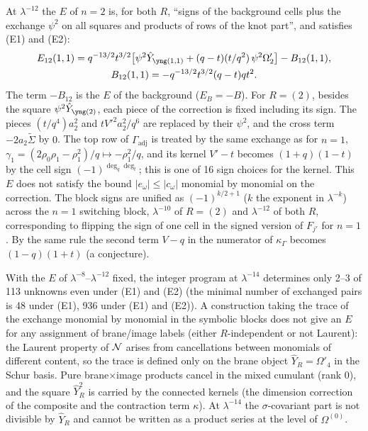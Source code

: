 \begin{result}[$E$ at $\lambda^{-12}$ for $n = 2$: full exchange]\label{cr:n2E}
At $\lambda^{-12}$ the $E$ of $n = 2$ is, for both $R$, ``signs of the background cells plus the exchange $\psi^2$ on all squares and products of rows of the knot part'', and satisfies (E1) and (E2):
\begin{gather}
E_{12}(1,1) = q^{-13/2}t^{3/2}\bigl[\psi^2\hat Y_{\yoneone} + (q-t)(t/q^2)\,\psi^2\Omega'_2\bigr] - B_{12}(1,1),\label{eq:E12}\\
B_{12}(1,1) = -q^{-13/2}t^{3/2}(q-t)qt^2 .\nonumber
\end{gather}
The term $-B_{12}$ is the $E$ of the background ($E_B = -B$). For $R = (2)$, besides the square $\psi^2\hat Y_{\ytwo}$, each piece of the correction is fixed including its sign. The pieces $(t/q^4)a_2^2$ and $tV'^2a_2^2/q^6$ are replaced by their $\psi^2$, and the cross term $-2a_2\tilde\Sigma$ by $0$. The top row of $\Gamma_{\mathrm{adj}}$ is treated by the same exchange as for $n = 1$, $\gamma_1 = (2\rho_0\rho_1 - \rho_1^2)/q \mapsto -\rho_1^2/q$, and its kernel $V' - t$ becomes $(1+q)(1-t)$ by the cell sign $(-1)^{\deg_q\deg_t}$; this is one of 16 sign choices for the kernel. This $E$ does not satisfy the bound $|e_\omega| \le |c_\omega|$ monomial by monomial on the correction. The block signs are unified as $(-1)^{k/2+1}$ ($k$ the exponent in $\lambda^{-k}$) across the $n = 1$ switching block, $\lambda^{-10}$ of $R = (2)$ and $\lambda^{-12}$ of both $R$, corresponding to flipping the sign of one cell in the signed version of $F_{j'}$ for $n = 1$. By the same rule the second term $V - q$ in the numerator of $\kappa_\Gamma$ becomes $(1-q)(1+t)$ (a conjecture).
\end{result}
\begin{result}\label{cr:n2negative}
With the $E$ of $\lambda^{-8}$--$\lambda^{-12}$ fixed, the integer program at $\lambda^{-14}$ determines only 2--3 of 113 unknowns even under (E1) and (E2) (the minimal number of exchanged pairs is 48 under (E1), 936 under (E1) and (E2)). A construction taking the trace of the exchange monomial by monomial in the symbolic blocks does not give an $E$ for any assignment of brane/image labels (either $R$-independent or not Laurent): the Laurent property of $\mathcal{N}$ arises from cancellations between monomials of different content, so the trace is defined only on the brane object $\hat Y_R = \Omega'_4$ in the Schur basis. Pure brane$\times$image products cancel in the mixed cumulant (rank 0), and the square $\hat Y_R^2$ is carried by the connected kernels (the dimension correction of the composite and the contraction term $\kappa$). At $\lambda^{-14}$ the $\sigma$-covariant part is not divisible by $\hat Y_R$ and cannot be written as a product series at the level of $\Omega^{(0)}$.
\end{result}
